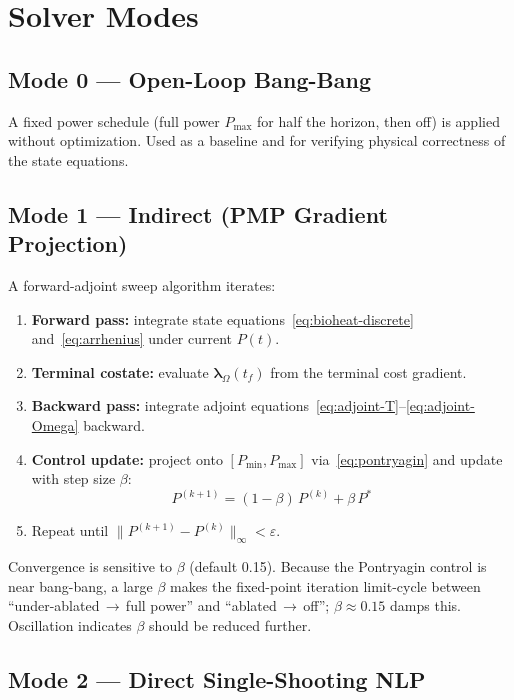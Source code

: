 \section{Solver Modes}

\subsection{Mode 0 — Open-Loop Bang-Bang}

A fixed power schedule (full power $P_{\max}$ for half the horizon,
then off) is applied without optimization.
Used as a baseline and for verifying physical correctness of the state
equations.

\subsection{Mode 1 — Indirect (PMP Gradient Projection)}

A forward-adjoint sweep algorithm iterates:
\begin{enumerate}
    \item \textbf{Forward pass:} integrate state equations~\eqref{eq:bioheat-discrete}
          and~\eqref{eq:arrhenius} under current $P(t)$.
    \item \textbf{Terminal costate:} evaluate $\boldsymbol{\lambda}_\Omega(t_f)$
          from the terminal cost gradient.
    \item \textbf{Backward pass:} integrate adjoint
          equations~\eqref{eq:adjoint-T}--\eqref{eq:adjoint-Omega} backward.
    \item \textbf{Control update:} project onto $[P_{\min}, P_{\max}]$ via~\eqref{eq:pontryagin}
          and update with step size $\beta$:
          \[P^{(k+1)} = (1-\beta)\,P^{(k)} + \beta\,P^*\]
    \item Repeat until $\|P^{(k+1)} - P^{(k)}\|_\infty < \varepsilon$.
\end{enumerate}
Convergence is sensitive to $\beta$ (default 0.15).
Because the Pontryagin control is near bang-bang, a large $\beta$ makes
the fixed-point iteration limit-cycle between ``under-ablated\,$\to$\,full
power'' and ``ablated\,$\to$\,off''; $\beta \approx 0.15$ damps this.
Oscillation indicates $\beta$ should be reduced further.

\subsection{Mode 2 — Direct Single-Shooting NLP}


